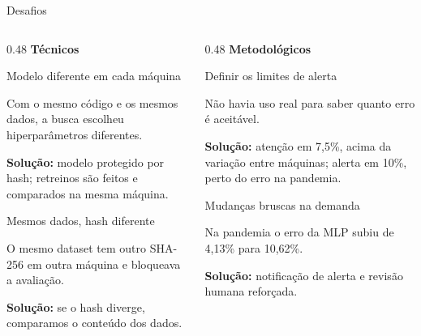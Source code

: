 \documentclass[aspectratio=169,10pt]{beamer}
\newcommand{\solucao}[1]{\par\vspace{2pt}\textcolor{uelgreen}{\textbf{Solução:}} #1}
\begin{document}
\begin{frame}{Desafios}
  \vfill
  \begin{columns}[T,onlytextwidth]
    \begin{column}[T]{0.48\textwidth}
      \vspace{0pt}
      {\color{dcblue}\large\textbf{Técnicos}}\par
      \vspace{0.2cm}
      \begin{block}{Modelo diferente em cada máquina}
        \begin{minipage}[t][1.45cm][t]{\linewidth}\raggedright
        Com o mesmo código e os mesmos dados, a busca escolheu hiperparâmetros diferentes.
        \solucao{modelo protegido por hash; retreinos são feitos e comparados na mesma máquina.}
        \end{minipage}
      \end{block}
      \vspace{0.3cm}
      \begin{block}{Mesmos dados, hash diferente}
        \begin{minipage}[t][1.45cm][t]{\linewidth}\raggedright
        O mesmo dataset tem outro SHA-256 em outra máquina e bloqueava a avaliação.
        \solucao{se o hash diverge, comparamos o conteúdo dos dados.}
        \end{minipage}
      \end{block}
    \end{column}
    \begin{column}[T]{0.48\textwidth}
      \vspace{0pt}
      {\color{uelgreen}\large\textbf{Metodológicos}}\par
      \vspace{0.2cm}
      \begin{block}{Definir os limites de alerta}
        \begin{minipage}[t][1.45cm][t]{\linewidth}\raggedright
        Não havia uso real para saber quanto erro é aceitável.
        \solucao{atenção em 7,5\%, acima da variação entre máquinas; alerta em 10\%, perto do erro na pandemia.}
        \end{minipage}
      \end{block}
      \vspace{0.3cm}
      \begin{block}{Mudanças bruscas na demanda}
        \begin{minipage}[t][1.45cm][t]{\linewidth}\raggedright
        Na pandemia o erro da MLP subiu de 4,13\% para 10,62\%.
        \solucao{notificação de alerta e revisão humana reforçada.}
        \end{minipage}
      \end{block}
    \end{column}
  \end{columns}
  \vfill
\end{frame}
\end{document}
